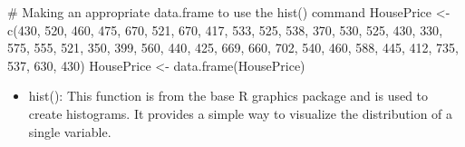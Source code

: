 \documentclass[
  letterpaper,
  DIV=11,
  numbers=noendperiod]{scrreprt}
\newenvironment{Shaded}{\begin{snugshade}}{\end{snugshade}}
\newcommand{\AttributeTok}[1]{\textcolor[rgb]{0.40,0.45,0.13}{#1}}
\newcommand{\CommentTok}[1]{\textcolor[rgb]{0.37,0.37,0.37}{#1}}
\newcommand{\DecValTok}[1]{\textcolor[rgb]{0.68,0.00,0.00}{#1}}
\newcommand{\FunctionTok}[1]{\textcolor[rgb]{0.28,0.35,0.67}{#1}}
\newcommand{\NormalTok}[1]{\textcolor[rgb]{0.00,0.23,0.31}{#1}}
\newcommand{\OtherTok}[1]{\textcolor[rgb]{0.00,0.23,0.31}{#1}}
\newcommand{\SpecialCharTok}[1]{\textcolor[rgb]{0.37,0.37,0.37}{#1}}
\newcommand{\StringTok}[1]{\textcolor[rgb]{0.13,0.47,0.30}{#1}}
\providecommand{\tightlist}{%
  \setlength{\itemsep}{0pt}\setlength{\parskip}{0pt}}\usepackage{longtable,booktabs,array}
\begin{document}
\begin{Shaded}
\begin{Highlighting}[]
\CommentTok{\# Making an appropriate data.frame to use the hist() command}
\NormalTok{HousePrice }\OtherTok{\textless{}{-}} \FunctionTok{c}\NormalTok{(}\DecValTok{430}\NormalTok{, }\DecValTok{520}\NormalTok{, }\DecValTok{460}\NormalTok{, }\DecValTok{475}\NormalTok{, }\DecValTok{670}\NormalTok{, }\DecValTok{521}\NormalTok{, }\DecValTok{670}\NormalTok{, }\DecValTok{417}\NormalTok{, }\DecValTok{533}\NormalTok{, }\DecValTok{525}\NormalTok{, }\DecValTok{538}\NormalTok{,}
    \DecValTok{370}\NormalTok{, }\DecValTok{530}\NormalTok{, }\DecValTok{525}\NormalTok{, }\DecValTok{430}\NormalTok{, }\DecValTok{330}\NormalTok{, }\DecValTok{575}\NormalTok{, }\DecValTok{555}\NormalTok{, }\DecValTok{521}\NormalTok{, }\DecValTok{350}\NormalTok{, }\DecValTok{399}\NormalTok{, }\DecValTok{560}\NormalTok{, }\DecValTok{440}\NormalTok{, }\DecValTok{425}\NormalTok{, }\DecValTok{669}\NormalTok{,}
    \DecValTok{660}\NormalTok{, }\DecValTok{702}\NormalTok{, }\DecValTok{540}\NormalTok{, }\DecValTok{460}\NormalTok{, }\DecValTok{588}\NormalTok{, }\DecValTok{445}\NormalTok{, }\DecValTok{412}\NormalTok{, }\DecValTok{735}\NormalTok{, }\DecValTok{537}\NormalTok{, }\DecValTok{630}\NormalTok{, }\DecValTok{430}\NormalTok{)}
\NormalTok{HousePrice }\OtherTok{\textless{}{-}} \FunctionTok{data.frame}\NormalTok{(HousePrice)}
\end{Highlighting}
\end{Shaded}

\begin{itemize}
\tightlist
\item
  hist(): This function is from the base R graphics package and is used
  to create histograms. It provides a simple way to visualize the
  distribution of a single variable.
\end{itemize}

\begin{Shaded}
\end{Shaded}
\end{document}
